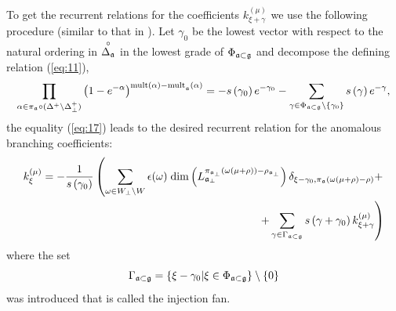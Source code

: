 \documentclass[12pt]{iopart}
\newcommand{\co}[1]{\stackrel{\circ }{#1}}
\begin{document}
To get the recurrent relations for the coefficients $k^{(\mu)}_{\xi+\gamma}$ we use the following procedure  (similar to that in \cite{ilyin812pbc}).
Let $\gamma_{0} $ be the lowest vector with respect to the natural ordering in $%
\co{\Delta _{\frak{a}}}$ in the lowest grade of $\Phi _{\frak{a}\subset \frak{g}}$ and decompose the defining relation (\ref{eq:11}),
\begin{equation}
  \label{eq:18}
  \prod_{\alpha\in \pi_{\mathfrak{a}}\circ (\Delta^{+}\setminus \Delta^{+}_{\bot})}\left(
    1-e^{-\alpha }\right) ^{\mathrm{{mult}\left( \alpha \right) -{mult}}_{\frak{a%
      }}\mathrm{\left( \alpha \right) }}=-s\left( \gamma _{0}\right) e^{-\gamma
    _{0}}-\sum_{\gamma \in \Phi _{\frak{a}\subset \frak{g}}\setminus \left\{\gamma_{0}\right\}}s\left( \gamma \right) e^{-\gamma },
\end{equation}
the equality (\ref{eq:17}) leads to the desired recurrent  relation for the anomalous branching coefficients:
\begin{eqnarray*}
  k_{\xi }^{\left( \mu \right) }=
  -\frac{1}{s\left( \gamma _{0}\right) }
  \left(
    \sum_{\omega\in W_{\bot}\backslash W} \epsilon(\omega)\; \mathrm{dim}
    \left(L^{\pi_{\mathfrak{a}_{\bot}}(\omega(\mu+\rho))-\rho_{\mathfrak{a}_{\bot}}}_{\mathfrak{a}_{\bot}}\right)
    \delta_{\xi-\gamma_0,\pi_{\mathfrak{a}}(\omega(\mu+\rho)-\rho)}+
    \right.\\
    \left. +
    \sum_{\gamma \in \Gamma _{\frak{a}\subset \frak{g}}} s\left( \gamma +\gamma _{0}\right) k_{\xi+\gamma }^{\left( \mu \right) }
  \right)
\label{recurrent-relation}
\end{eqnarray*}
where the set
\begin{equation}
\Gamma _{\frak{a}\subset \frak{g}}=\left\{ \xi -\gamma _{0}|\xi \in \Phi _{%
\frak{a}\subset \frak{g}}\right\} \setminus \left\{ 0\right\} 
\label{fan-defined}
\end{equation}
 was introduced that is called the injection fan.
\end{document}
